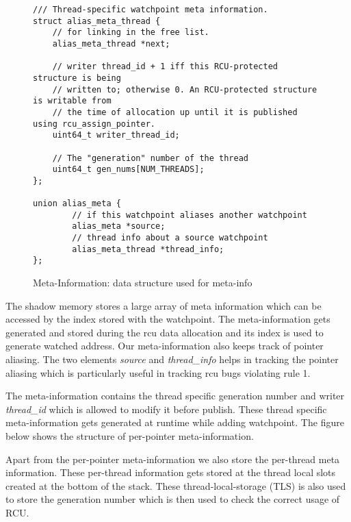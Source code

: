 \begin{figure}[h]
\centering
\begin{lstlisting}
/// Thread-specific watchpoint meta information.
struct alias_meta_thread {
    // for linking in the free list.
    alias_meta_thread *next;

    // writer thread_id + 1 iff this RCU-protected structure is being
    // written to; otherwise 0. An RCU-protected structure is writable from
    // the time of allocation up until it is published using rcu_assign_pointer.
    uint64_t writer_thread_id;

    // The "generation" number of the thread
    uint64_t gen_nums[NUM_THREADS];
};

union alias_meta {
        // if this watchpoint aliases another watchpoint
        alias_meta *source;
        // thread info about a source watchpoint
        alias_meta_thread *thread_info;
}; 
\end{lstlisting}
\caption{Meta-Information: data structure used for meta-info}\label{fig:metainfo}
\end{figure}



The shadow memory stores a large array of meta information which can be accessed by the index stored with the watchpoint. The meta-information gets generated and stored during the rcu data allocation and its index is used to generate watched address. Our meta-information also keeps track of pointer aliasing. The two elements \emph{source} and \emph{thread\_info} helps in tracking the pointer aliasing which is particularly useful in tracking rcu bugs violating rule 1.

The meta-information contains the thread specific generation number and writer \emph{thread\_id} which is allowed to modify it before publish. These thread specific meta-information gets generated at runtime while adding watchpoint. The figure below shows the structure of per-pointer meta-information.

Apart from the per-pointer meta-information we also store the per-thread meta information. These per-thread information gets stored at the thread local slots created at the bottom of the stack. These thread-local-storage (TLS) is also used to store the generation number which is then used to check the correct usage of RCU.

